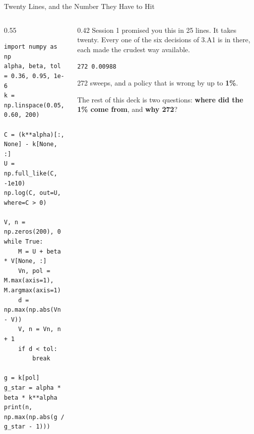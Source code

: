 \begin{frame}[fragile]{Twenty Lines, and the Number They Have to Hit}
\begin{columns}[T]
\begin{column}{0.55\textwidth}
\begin{lstlisting}
import numpy as np
alpha, beta, tol = 0.36, 0.95, 1e-6
k = np.linspace(0.05, 0.60, 200)

C = (k**alpha)[:, None] - k[None, :]
U = np.full_like(C, -1e10)
np.log(C, out=U, where=C > 0)

V, n = np.zeros(200), 0
while True:
    M = U + beta * V[None, :]
    Vn, pol = M.max(axis=1), M.argmax(axis=1)
    d = np.max(np.abs(Vn - V))
    V, n = Vn, n + 1
    if d < tol:
        break

g = k[pol]
g_star = alpha * beta * k**alpha
print(n, np.max(np.abs(g / g_star - 1)))
\end{lstlisting}
\end{column}
\begin{column}{0.42\textwidth}
\small
Session 1 promised you this in 25 lines. It takes twenty. Every one of the six decisions of 3.A1 is in there, each made the crudest way available.
\medskip
\begin{examplebox}\footnotesize
\texttt{272 0.00988}
\end{examplebox}
\vspace{-1mm}
\begin{conceptbox}\footnotesize
272 sweeps, and a policy that is wrong by up to \textbf{1\%}.
\end{conceptbox}
\medskip
\footnotesize
The rest of this deck is two questions: \textbf{where did the 1\% come from}, and \textbf{why 272}?
\end{column}
\end{columns}
\end{frame}

